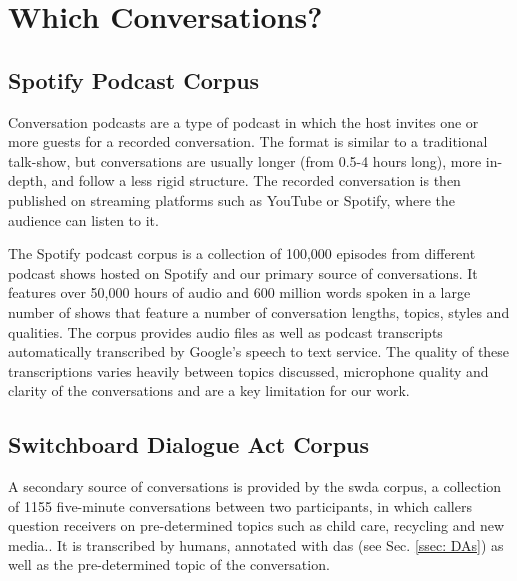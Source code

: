 \section{Which Conversations?}
    \subsection{Spotify Podcast Corpus \label{ssec: spotify corpus}}
        Conversation podcasts are a type of podcast in which the host invites one or more guests for a recorded conversation. The format is similar to a traditional talk-show, but conversations are usually longer (from 0.5-4 hours long), more in-depth, and follow a less rigid structure.  The recorded conversation is then published on streaming platforms such as YouTube or Spotify, where the audience can listen to it.
        
        The Spotify podcast corpus\cite{clifton-2020100000} is a collection of 100,000 episodes from different podcast shows hosted on Spotify and our primary source of conversations. It features over 50,000 hours of audio and 600 million words spoken in a large number of shows that feature a number of conversation lengths, topics, styles and qualities. The corpus provides audio files as well as podcast transcripts automatically transcribed by Google's speech to text service. The quality of these transcriptions varies heavily between topics discussed, microphone quality and clarity of the conversations and are a key limitation for our work.
        
    \subsection{Switchboard Dialogue Act Corpus \label{ssec: swda}}
        A secondary source of conversations is provided by the \gls{swda} corpus, a collection of 1155 five-minute conversations between two participants, in which callers question receivers on pre-determined topics such as child care, recycling and new media.\cite{fang2012annotation}. It is transcribed by humans, annotated with \glspl{da} (see Sec. \ref{ssec: DAs}) as well as the pre-determined topic of the conversation.
